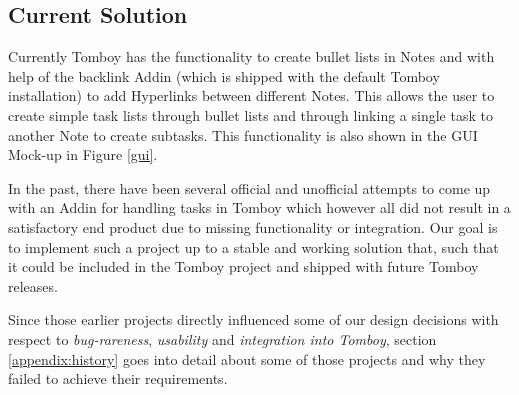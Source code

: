 \subsection{Current Solution}
\label{description:solution}
Currently Tomboy has the functionality to create bullet lists in Notes and with help of the backlink Addin (which is shipped with the default Tomboy installation) to add Hyperlinks between different Notes. This allows the user to create simple task lists through bullet lists and through linking a single task to another Note to create subtasks. This functionality is also shown in the GUI Mock-up in Figure \ref{gui}.

In the past, there have been several official and unofficial attempts to come up with an Addin for handling tasks in Tomboy which however all did not result in a satisfactory end product due to missing functionality or integration. Our goal is to implement such a project up to a stable and working solution that, such that it could be included in the Tomboy project and shipped with future Tomboy releases. 

Since those earlier projects directly influenced some of our design decisions with respect to \textit{bug-rareness}, \textit{usability} and \textit{integration into Tomboy}, section \ref{appendix:history} goes into detail about some of those projects and why they failed to achieve their requirements.


